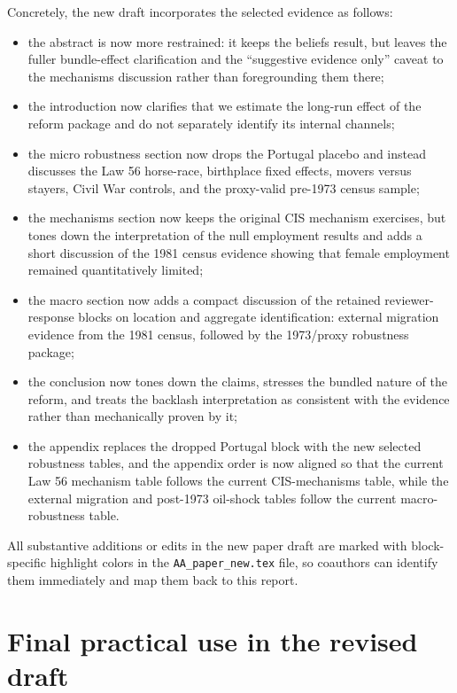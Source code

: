 \documentclass[11pt]{article}
\begin{document}
Concretely, the new draft incorporates the selected evidence as follows:
\begin{itemize}[leftmargin=*]
\item the abstract is now more restrained: it keeps the beliefs result, but leaves the fuller bundle-effect clarification and the ``suggestive evidence only'' caveat to the mechanisms discussion rather than foregrounding them there;
\item the introduction now clarifies that we estimate the long-run effect of the reform package and do not separately identify its internal channels;
\item the micro robustness section now drops the Portugal placebo and instead discusses the Law 56 horse-race, birthplace fixed effects, movers versus stayers, Civil War controls, and the proxy-valid pre-1973 census sample;
\item the mechanisms section now keeps the original CIS mechanism exercises, but tones down the interpretation of the null employment results and adds a short discussion of the 1981 census evidence showing that female employment remained quantitatively limited;
\item the macro section now adds a compact discussion of the retained reviewer-response blocks on location and aggregate identification: external migration evidence from the 1981 census, followed by the 1973/proxy robustness package;
\item the conclusion now tones down the claims, stresses the bundled nature of the reform, and treats the backlash interpretation as consistent with the evidence rather than mechanically proven by it;
\item the appendix replaces the dropped Portugal block with the new selected robustness tables, and the appendix order is now aligned so that the current Law 56 mechanism table follows the current CIS-mechanisms table, while the external migration and post-1973 oil-shock tables follow the current macro-robustness table.
\end{itemize}

All substantive additions or edits in the new paper draft are marked with block-specific highlight colors in the \texttt{AA\_paper\_new.tex} file, so coauthors can identify them immediately and map them back to this report.

\section*{Final practical use in the revised draft}
\end{document}
